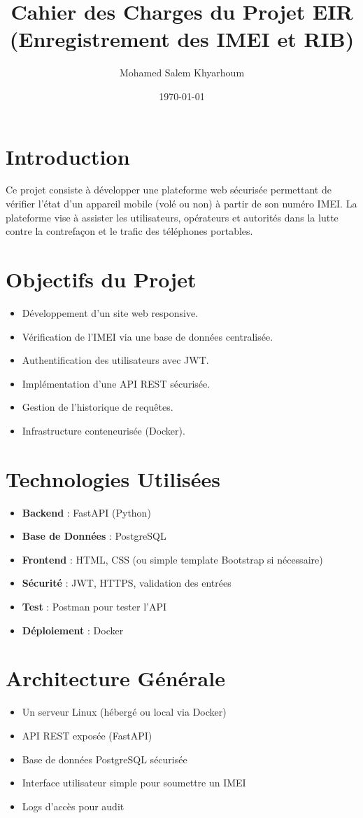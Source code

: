 \documentclass[12pt,a4paper]{article}
\title{Cahier des Charges du Projet EIR (Enregistrement des IMEI et RIB)}
\author{Mohamed Salem Khyarhoum}
\date{\today}
\begin{document}
\maketitle
\tableofcontents
\newpage

\section{Introduction}
Ce projet consiste à développer une plateforme web sécurisée permettant de vérifier l’état d’un appareil mobile (volé ou non) à partir de son numéro IMEI. La plateforme vise à assister les utilisateurs, opérateurs et autorités dans la lutte contre la contrefaçon et le trafic des téléphones portables.

\section{Objectifs du Projet}
\begin{itemize}
    \item Développement d’un site web responsive.
    \item Vérification de l’IMEI via une base de données centralisée.
    \item Authentification des utilisateurs avec JWT.
    \item Implémentation d’une API REST sécurisée.
    \item Gestion de l’historique de requêtes.
    \item Infrastructure conteneurisée (Docker).
\end{itemize}

\section{Technologies Utilisées}
\begin{itemize}
    \item \textbf{Backend} : FastAPI (Python)
    \item \textbf{Base de Données} : PostgreSQL
    \item \textbf{Frontend} : HTML, CSS (ou simple template Bootstrap si nécessaire)
    \item \textbf{Sécurité} : JWT, HTTPS, validation des entrées
    \item \textbf{Test} : Postman pour tester l’API
    \item \textbf{Déploiement} : Docker
\end{itemize}

\section{Architecture Générale}
\begin{itemize}
    \item Un serveur Linux (hébergé ou local via Docker)
    \item API REST exposée (FastAPI)
    \item Base de données PostgreSQL sécurisée
    \item Interface utilisateur simple pour soumettre un IMEI
    \item Logs d’accès pour audit
\end{itemize}
\end{document}
